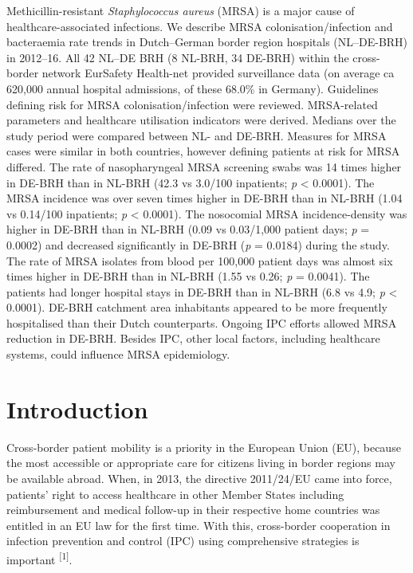 \documentclass[
]{book}
\begin{document}
Methicillin-resistant \emph{Staphylococcus aureus} (MRSA) is a major cause of healthcare-associated infections. We describe MRSA colonisation/infection and bacteraemia rate trends in Dutch--German border region hospitals (NL--DE-BRH) in 2012--16. All 42 NL--DE BRH (8 NL-BRH, 34 DE-BRH) within the cross-border network EurSafety Health-net provided surveillance data (on average ca 620,000 annual hospital admissions, of these 68.0\% in Germany). Guidelines defining risk for MRSA colonisation/infection were reviewed. MRSA-related parameters and healthcare utilisation indicators were derived. Medians over the study period were compared between NL- and DE-BRH. Measures for MRSA cases were similar in both countries, however defining patients at risk for MRSA differed. The rate of nasopharyngeal MRSA screening swabs was 14 times higher in DE-BRH than in NL-BRH (42.3 vs 3.0/100 inpatients; \emph{p} \textless{} 0.0001). The MRSA incidence was over seven times higher in DE-BRH than in NL-BRH (1.04 vs 0.14/100 inpatients; \emph{p} \textless{} 0.0001). The nosocomial MRSA incidence-density was higher in DE-BRH than in NL-BRH (0.09 vs 0.03/1,000 patient days; \emph{p} = 0.0002) and decreased significantly in DE-BRH (\emph{p} = 0.0184) during the study. The rate of MRSA isolates from blood per 100,000 patient days was almost six times higher in DE-BRH than in NL-BRH (1.55 vs 0.26; \emph{p} = 0.0041). The patients had longer hospital stays in DE-BRH than in NL-BRH (6.8 vs 4.9; \emph{p} \textless{} 0.0001). DE-BRH catchment area inhabitants appeared to be more frequently hospitalised than their Dutch counterparts. Ongoing IPC efforts allowed MRSA reduction in DE-BRH. Besides IPC, other local factors, including healthcare systems, could influence MRSA epidemiology.

\hypertarget{introduction-6}{%
\section{Introduction}\label{introduction-6}}

Cross-border patient mobility is a priority in the European Union (EU), because the most accessible or appropriate care for citizens living in border regions may be available abroad. When, in 2013, the directive 2011/24/EU came into force, patients' right to access healthcare in other Member States including reimbursement and medical follow-up in their respective home countries was entitled in an EU law for the first time. With this, cross-border cooperation in infection prevention and control (IPC) using comprehensive strategies is important \textsuperscript{{[}1{]}}.
\end{document}
